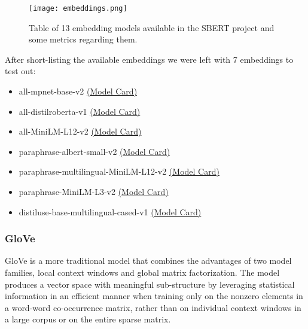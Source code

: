 \begin{figure}[!ht]
\centerline{\texttt{[image: embeddings.png]}   }
\caption{Table of 13 embedding models available in the SBERT project and some metrics regarding them. \citep{link_sbert_tabela}}
\label{embeddings}
\end{figure}


After short-listing the available embeddings we were left with 7 embeddings to test out:
\begin{itemize}
    \item all-mpnet-base-v2 \citep{mpnet} \href{https://huggingface.co/sentence-transformers/all-mpnet-base-v2}{(Model Card)}
    \item all-distilroberta-v1 \citep{roberta, distillbert} \href{https://huggingface.co/sentence-transformers/all-distilroberta-v1}{(Model Card)}
    \item all-MiniLM-L12-v2 \citep{minilm}  \href{https://huggingface.co/sentence-transformers/all-MiniLM-L12-v2}{(Model Card)}
    \item paraphrase-albert-small-v2 \citep{albert}  \href{https://huggingface.co/sentence-transformers/paraphrase-albert-small-v2}{(Model Card)}
    \item paraphrase-multilingual-MiniLM-L12-v2 \citep{minilm}  \href{https://huggingface.co/sentence-transformers/paraphrase-multilingual-MiniLM-L12-v2}{(Model Card)}
    \item paraphrase-MiniLM-L3-v2 \citep{minilm}  \href{https://huggingface.co/sentence-transformers/paraphrase-MiniLM-L3-v2}{(Model Card)}
    \item distiluse-base-multilingual-cased-v1 \citep{distillbert}  \href{https://huggingface.co/sentence-transformers/distiluse-base-multilingual-cased-v1}{(Model Card)}
\end{itemize}


\subsubsection{GloVe}

GloVe \citep{glove} is a more traditional model that combines the advantages of two model families, local context windows and global matrix factorization. 
The model produces a vector space with meaningful sub-structure by leveraging statistical information in an efficient manner when training only on the nonzero elements in a word-word co-occurrence matrix, rather than on individual context windows in a large corpus or on the entire sparse matrix. 

